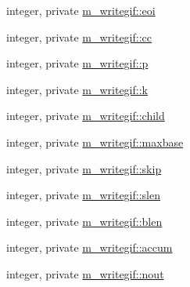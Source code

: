 \begin{DoxyCompactItemize}
\item 
integer, private \hyperlink{namespacem__writegif_a4f0ce85ba2c32d98d9c88801be25cd1f}{m\+\_\+writegif\+::eoi}
\item 
integer, private \hyperlink{namespacem__writegif_a4dc9a91a4e7fde14eff0bab58278e61b}{m\+\_\+writegif\+::cc}
\item 
integer, private \hyperlink{namespacem__writegif_a34d3a64b1381a281909da380d922d770}{m\+\_\+writegif\+::p}
\item 
integer, private \hyperlink{namespacem__writegif_a29211b5bf371e3be08c3047bc80d3e91}{m\+\_\+writegif\+::k}
\item 
integer, private \hyperlink{namespacem__writegif_a5e1b83b3bc6e486c730832371c48f6e0}{m\+\_\+writegif\+::child}
\item 
integer, private \hyperlink{namespacem__writegif_ae052e1663af721294a611d19b300a8ef}{m\+\_\+writegif\+::maxbase}
\item 
integer, private \hyperlink{namespacem__writegif_aaf7927ca24ee3d409138c18d7d254433}{m\+\_\+writegif\+::skip}
\item 
integer, private \hyperlink{namespacem__writegif_ad3e590b43489ea5d2c357953adaca817}{m\+\_\+writegif\+::slen}
\item 
integer, private \hyperlink{namespacem__writegif_add860aadf7250b3b589b697cc90fcccf}{m\+\_\+writegif\+::blen}
\item 
integer, private \hyperlink{namespacem__writegif_a2a80a14e30c6ed2b0003d46a93480531}{m\+\_\+writegif\+::accum}
\item 
integer, private \hyperlink{namespacem__writegif_a91b7b1d0dd2ced615d855f3440716415}{m\+\_\+writegif\+::nout}
\end{DoxyCompactItemize}
